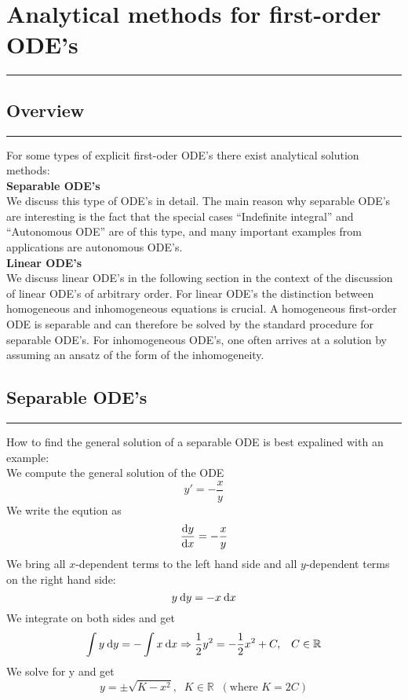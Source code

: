 \section{Analytical methods for first-order ODE’s}
\noindent\rule[\linienAbstand]{\linewidth}{\linienDickeDick}

\subsection{Overview}
\noindent\rule[\linienAbstand]{\linewidth}{\linienDicke}
For some types of explicit first-oder ODE’s there exist analytical solution methods:\\

\textbf{Separable ODE's}\\
We discuss this type of ODE’s in detail. The main reason why separable ODE’s are interesting is the fact that the special cases “Indefinite integral” and “Autonomous ODE” are of this type, and many important examples from applications are autonomous ODE’s.\\

\textbf{Linear ODE's}\\
We discuss linear ODE’s in the following section in the context of the discussion of linear ODE’s of arbitrary order. For linear ODE’s the distinction between homogeneous and inhomogeneous equations is crucial. A homogeneous first-order ODE is separable and can therefore be solved by the standard procedure for separable ODE’s. For inhomogeneous ODE’s, one often arrives at a solution by assuming an ansatz of the form of the inhomogeneity.\\


\subsection{Separable ODE’s}
\noindent\rule[\linienAbstand]{\linewidth}{\linienDicke}
How to find the general solution of a separable ODE is best expalined with an example:\\
We compute the general solution of the ODE
\begin{equation}
  y' = -\frac{x}{y}
\end{equation}
We write the eqution as
\begin{equation}
  \frac{\textup{d}y}{\textup{d}x} = -\frac{x}{y}
\end{equation}
We bring all $x$-dependent terms to the left hand side and all $y$-dependent terms on
the right hand side:
\begin{equation}
  y\:\textup{d}y = -x \:\textup{d}x
\end{equation}
We integrate on both sides and get
\begin{equation}
  \int y\:\textup{d}y = - \int x\:\textup{d}x \Rightarrow \frac{1}{2}y^2 = - \frac{1}{2} x^2 + C, \;\;\; C \in \mathbb{R}
\end{equation}
We solve for y and get
\begin{equation}
  y = \pm \sqrt{K - x^2}, \;\; K \in \mathbb{R}\;\; (\text{where } K = 2C)
\end{equation}

